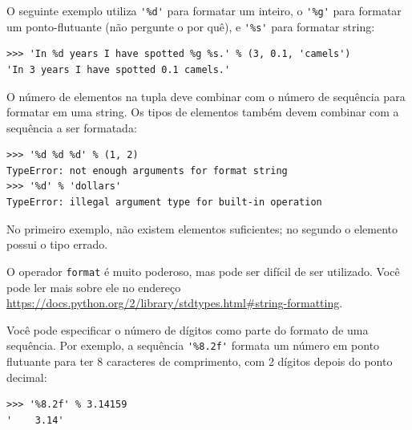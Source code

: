 {O seguinte exemplo utiliza \verb"'%d'" para formatar um inteiro, o
\verb"'%g'" para formatar um ponto-flutuante (não pergunte o por quê), e
\verb"'%s'" para formatar string:

\beforeverb
\begin{verbatim}
>>> 'In %d years I have spotted %g %s.' % (3, 0.1, 'camels')
'In 3 years I have spotted 0.1 camels.'
\end{verbatim}
\afterverb
%
%
O número de elementos na tupla deve combinar com o número de sequência
para formatar em uma string. Os tipos de elementos também devem combinar
com a sequência a ser formatada:


\beforeverb
\begin{verbatim}
>>> '%d %d %d' % (1, 2)
TypeError: not enough arguments for format string
>>> '%d' % 'dollars'
TypeError: illegal argument type for built-in operation
\end{verbatim}
\afterverb
%
%
No primeiro exemplo, não existem elementos suficientes; no segundo o elemento
possui o tipo errado.


O operador {\tt format} é muito poderoso, mas pode ser difícil de ser
utilizado. Você pode ler mais sobre ele no endereço
\url{https://docs.python.org/2/library/stdtypes.html#string-formatting}.


Você pode especificar o número de dígitos como parte do formato de uma sequência.
Por exemplo, a sequência \verb"'%8.2f'"
formata um número em ponto flutuante para ter 8 caracteres de comprimento, com
2 dígitos depois do ponto decimal:

\beforeverb
\begin{verbatim}
>>> '%8.2f' % 3.14159
'    3.14'
\end{verbatim}
\afterverb
%

}
